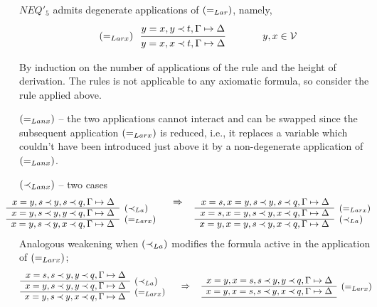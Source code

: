 \begin{LEMMA}\label{le:noax}
$NEQ'_5$ admits degenerate applications of $(=_{Lar})$, namely, 
\[
\eLarx\ \ \mprule{y=x, y\Incl t,\GSD}{y=x, x\Incl t,\GSD}\ \ \ \ \ \ \ \ \ \ \ 
 y,x\in\Vars
\]
\end{LEMMA}
\begin{PROOF}
By %
induction on the number of applications of the rule and the height
of derivation. The rules is not applicable to any axiomatic formula, so
consider the rule applied above.
\begin{LS}
\item $(=_{Lanx})$ -- the two applications cannot interact and can be swapped %
since the subsequent application $(=_{Larx})$ is 
reduced, i.e.,
it replaces a variable which couldn't have been introduced just above it by a 
non-degenerate application of $(=_{Lanx})$. 
\item $(\mathbin{\prec}_{Lanx})$ -- two cases 
\[\sma{ \prar{
  x=y, s\Incl y, s\Incl q,\GSD \cl
  x=y, s\Incl y, y\Incl q,\GSD & \rabove{\iLa} \cl
  x=y, s\Incl y, x\Incl q,\GSD & \rabove{\eLarx}
}\conv
\prar{
  x=s, x=y, s\Incl y, s\Incl q,\GSD \cl
  x=s, x=y, s\Incl y, x\Incl q,\GSD & \rabove{\eLarx} \cl
  x=y, x=y, s\Incl y, x\Incl q,\GSD & \rabove{\iLa} 
} }
\]
Analogous weakening when $(\mathbin{\prec}_{La})$ modifies the formula 
active in the application of $(=_{Larx})$;
\[\prarc{
 x=s, s\Incl y, y\Incl q, \GSD \cl
 x=y, s\Incl y, y\Incl q, \GSD & \rabove{\iLa} \cl
 x=y, s\Incl y, x\Incl q, \GSD & \rabove{\eLarx}
 }\conv
\prarc{
  x=y, x=s, s\Incl y, y\Incl q, \GSD \cl
  x=y, x=s, s\Incl y, x\Incl q, \GSD & \rabove{\eLarx} \cl
}\]
\end{LS}
\end{PROOF}
